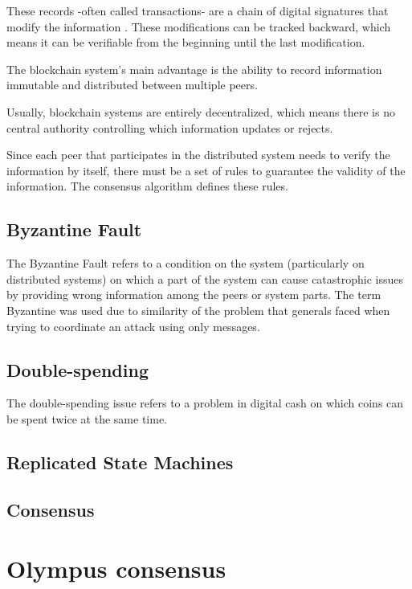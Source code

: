 \documentclass{article}
\begin{document}
	These records -often called transactions- are a chain of digital signatures that modify the information \cite[p.2]{bitcoin-whitepaper}. These modifications can be tracked backward, which means it can be verifiable from the beginning until the last modification.
	
	The blockchain system's main advantage is the ability to record information immutable and distributed between multiple peers.
	
	Usually, blockchain systems are entirely decentralized, which means there is no central authority controlling which information updates or rejects. 
	
	Since each peer that participates in the distributed system needs to verify the information by itself, there must be a set of rules to guarantee the validity of the information. The consensus algorithm defines these rules.
	
	\subsection{Byzantine Fault}		
	
	The Byzantine Fault refers to a condition on the system (particularly on distributed systems) on which a part of the system can cause catastrophic issues by providing wrong information among the peers or system parts.  The term Byzantine was used due to similarity of the problem that generals faced when trying to coordinate an attack using only messages. \cite{byzantine-general-problem}
	
	\subsection{Double-spending}		
		
	The double-spending issue refers to a problem in digital cash on which coins can be spent twice at the same time. 
				
	\subsection{Replicated State Machines}	
	
	\subsection{Consensus}	
	
	\section{Olympus consensus}
	
\end{document}
